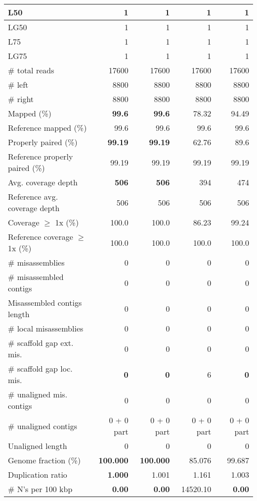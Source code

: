 \documentclass[12pt,a4paper]{article}
\begin{document}
\begin{table}[ht]
\begin{center}
\begin{tabular}{|l*{4}{|r}|}
L50 & 1 & 1 & 1 & 1 \\ \hline
LG50 & 1 & 1 & 1 & 1 \\ \hline
L75 & 1 & 1 & 1 & 1 \\ \hline
LG75 & 1 & 1 & 1 & 1 \\ \hline
\# total reads & 17600 & 17600 & 17600 & 17600 \\ \hline
\# left & 8800 & 8800 & 8800 & 8800 \\ \hline
\# right & 8800 & 8800 & 8800 & 8800 \\ \hline
Mapped (\%) & {\bf 99.6} & {\bf 99.6} & 78.32 & 94.49 \\ \hline
Reference mapped (\%) & 99.6 & 99.6 & 99.6 & 99.6 \\ \hline
Properly paired (\%) & {\bf 99.19} & {\bf 99.19} & 62.76 & 89.6 \\ \hline
Reference properly paired (\%) & 99.19 & 99.19 & 99.19 & 99.19 \\ \hline
Avg. coverage depth & {\bf 506} & {\bf 506} & 394 & 474 \\ \hline
Reference avg. coverage depth & 506 & 506 & 506 & 506 \\ \hline
Coverage $\geq$ 1x (\%) & 100.0 & 100.0 & 86.23 & 99.24 \\ \hline
Reference coverage $\geq$ 1x (\%) & 100.0 & 100.0 & 100.0 & 100.0 \\ \hline
\# misassemblies & 0 & 0 & 0 & 0 \\ \hline
\# misassembled contigs & 0 & 0 & 0 & 0 \\ \hline
Misassembled contigs length & 0 & 0 & 0 & 0 \\ \hline
\# local misassemblies & 0 & 0 & 0 & 0 \\ \hline
\# scaffold gap ext. mis. & 0 & 0 & 0 & 0 \\ \hline
\# scaffold gap loc. mis. & {\bf 0} & {\bf 0} & 6 & {\bf 0} \\ \hline
\# unaligned mis. contigs & 0 & 0 & 0 & 0 \\ \hline
\# unaligned contigs & 0 + 0 part & 0 + 0 part & 0 + 0 part & 0 + 0 part \\ \hline
Unaligned length & 0 & 0 & 0 & 0 \\ \hline
Genome fraction (\%) & {\bf 100.000} & {\bf 100.000} & 85.076 & 99.687 \\ \hline
Duplication ratio & {\bf 1.000} & 1.001 & 1.161 & 1.003 \\ \hline
\# N's per 100 kbp & {\bf 0.00} & {\bf 0.00} & 14520.10 & {\bf 0.00} \\ \hline

\end{tabular}
\end{center}
\end{table}
\end{document}
